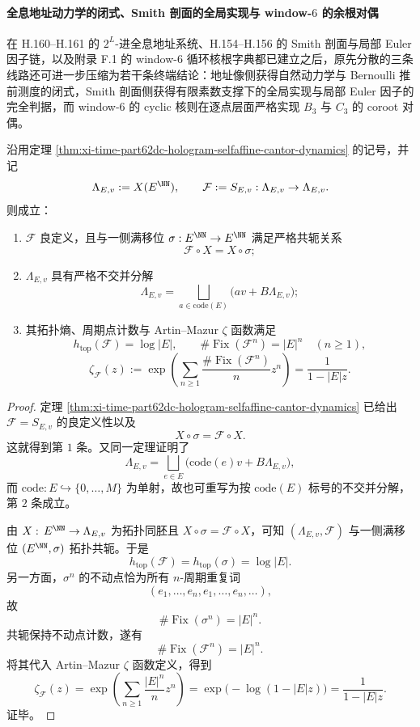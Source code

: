 \paragraph{全息地址动力学的闭式、Smith 剖面的全局实现与 window-\texorpdfstring{$6$}{6} 的余根对偶}
在 H.160--H.161 的 \(2^L\)-进全息地址系统、H.154--H.156 的 Smith 剖面与局部 Euler 因子链，以及附录 F.1 的 window-\(6\) 循环核根字典都已建立之后，原先分散的三条线路还可进一步压缩为若干条终端结论：地址像侧获得自然动力学与 Bernoulli 推前测度的闭式，Smith 剖面侧获得有限素数支撑下的全局实现与局部 Euler 因子的完全判据，而 window-\(6\) 的 cyclic 核则在逐点层面严格实现 \(B_3\) 与 \(C_3\) 的 coroot 对偶。

\begin{theorem}\label{thm:xi-time-part62de-hologram-natural-dynamics-fullshift}
沿用定理 \ref{thm:xi-time-part62dc-hologram-selfaffine-cantor-dynamics} 的记号，并记
\[
\Lambda_{E,v}:=X(E^{\NN}),
\qquad
\mathcal F:=S_{E,v}:\Lambda_{E,v}\to \Lambda_{E,v}.
\]
则成立：
\begin{enumerate}
  \item \(\mathcal F\) 良定义，且与一侧满移位 \(\sigma:E^{\NN}\to E^{\NN}\) 满足严格共轭关系
  \[
  \mathcal F\circ X=X\circ \sigma;
  \]
  \item \(\Lambda_{E,v}\) 具有严格不交并分解
  \[
  \Lambda_{E,v}
  =
  \bigsqcup_{a\in \mathrm{code}(E)}\bigl(av+B\Lambda_{E,v}\bigr);
  \]
  \item 其拓扑熵、周期点计数与 Artin--Mazur \(\zeta\) 函数满足
  \[
  h_{\mathrm{top}}(\mathcal F)=\log |E|,
  \qquad
  \#\operatorname{Fix}(\mathcal F^n)=|E|^n
  \quad (n\ge 1),
  \]
  \[
  \zeta_{\mathcal F}(z)
  :=
  \exp\!\left(\sum_{n\ge 1}\frac{\#\operatorname{Fix}(\mathcal F^n)}{n}z^n\right)
  =
  \frac{1}{1-|E|z}.
  \]
\end{enumerate}
\end{theorem}
\begin{proof}
定理 \ref{thm:xi-time-part62dc-hologram-selfaffine-cantor-dynamics} 已给出 \(\mathcal F=S_{E,v}\) 的良定义性以及
\[
X\circ \sigma=\mathcal F\circ X.
\]
这就得到第 \(1\) 条。又同一定理证明了
\[
\Lambda_{E,v}
=
\bigsqcup_{e\in E}\bigl(\mathrm{code}(e)v+B\Lambda_{E,v}\bigr),
\]
而 \(\mathrm{code}:E\hookrightarrow \{0,\dots,M\}\) 为单射，故也可重写为按 \(\mathrm{code}(E)\) 标号的不交并分解，第 \(2\) 条成立。

由 \(X:\,E^{\NN}\to \Lambda_{E,v}\) 为拓扑同胚且 \(X\circ \sigma=\mathcal F\circ X\)，可知 \((\Lambda_{E,v},\mathcal F)\) 与一侧满移位 \((E^{\NN},\sigma)\) 拓扑共轭。于是
\[
h_{\mathrm{top}}(\mathcal F)=h_{\mathrm{top}}(\sigma)=\log |E|.
\]
另一方面，\(\sigma^n\) 的不动点恰为所有 \(n\)-周期重复词
\[
(e_1,\dots,e_n,e_1,\dots,e_n,\dots),
\]
故
\[
\#\operatorname{Fix}(\sigma^n)=|E|^n.
\]
共轭保持不动点计数，遂有
\[
\#\operatorname{Fix}(\mathcal F^n)=|E|^n.
\]
将其代入 Artin--Mazur \(\zeta\) 函数定义，得到
\[
\zeta_{\mathcal F}(z)
=
\exp\!\left(\sum_{n\ge 1}\frac{|E|^n}{n}z^n\right)
=
\exp\!\bigl(-\log(1-|E|z)\bigr)
=
\frac{1}{1-|E|z}.
\]
证毕。
\end{proof}

